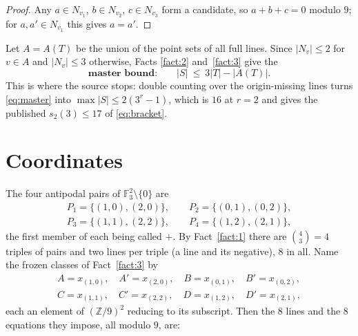 \documentclass[11pt]{amsart}
\newcommand{\ZZ}{\mathbb Z}
\newcommand{\FF}{\mathbb F}
\begin{document}
\begin{proof}
Any $a\in N_{v_1}$, $b\in N_{v_2}$, $c\in N_{v_3}$ form a candidate, so
$a+b+c=0$ modulo $9$; for $a,a'\in N_{v_1}$ this gives $a=a'$.
\end{proof}

Let $A=A(T)$ be the union of the point sets of all full lines. Since
$|N_v|\le2$ for $v\in A$ and $|N_v|\le3$ otherwise, Facts \ref{fact:2}
and~\ref{fact:3} give the
\begin{equation}\label{eq:master}
  \textbf{master bound:}\qquad |S|\ \le\ 3|T|-|A(T)|.
\end{equation}
This is where the source stops: double counting over the origin-missing lines
turns \eqref{eq:master} into $\max|S|\le2(3^r-1)$, which is $16$ at $r=2$ and
gives the published $s_2(3)\le17$ of \eqref{eq:bracket}.

\section{Coordinates}\label{sec:coords}

The four antipodal pairs of $\FF_3^2\setminus\{0\}$ are
\[
\begin{gathered}
  P_1=\{(1,0),(2,0)\},\qquad
  P_2=\{(0,1),(0,2)\},\\
  P_3=\{(1,1),(2,2)\},\qquad
  P_4=\{(1,2),(2,1)\},
\end{gathered}
\]
the first member of each being called $+$. By Fact~\ref{fact:1} there are
$\binom43=4$ triples of pairs and two lines per triple (a line and its
negative), $8$ in all. Name the frozen classes of Fact~\ref{fact:3} by
\[
\begin{gathered}
  A=x_{(1,0)},\quad A'=x_{(2,0)},\quad B=x_{(0,1)},\quad B'=x_{(0,2)},\\
  C=x_{(1,1)},\quad C'=x_{(2,2)},\quad D=x_{(1,2)},\quad D'=x_{(2,1)},
\end{gathered}
\]
each an element of $(\ZZ/9)^2$ reducing to its subscript. Then the $8$ lines and
the $8$ equations they impose, all modulo $9$, are:
\end{document}
